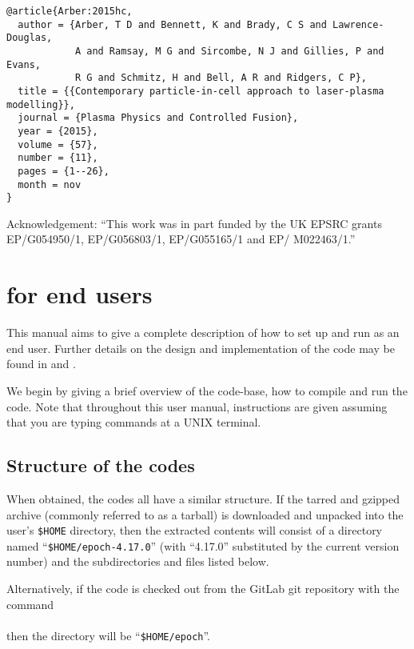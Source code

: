 \begin{verbatim}
@article{Arber:2015hc,
  author = {Arber, T D and Bennett, K and Brady, C S and Lawrence-Douglas,
            A and Ramsay, M G and Sircombe, N J and Gillies, P and Evans,
            R G and Schmitz, H and Bell, A R and Ridgers, C P},
  title = {{Contemporary particle-in-cell approach to laser-plasma modelling}},
  journal = {Plasma Physics and Controlled Fusion},
  year = {2015},
  volume = {57},
  number = {11},
  pages = {1--26},
  month = nov
}
\end{verbatim}

Acknowledgement: ``This work was in part funded by the UK EPSRC grants
EP/G054950/1, EP/G056803/1, EP/G055165/1 and EP/ M022463/1.''

\newpage
\section{\texorpdfstring
  {{\EPOCH} for end users}
  {{EPOCH} for end users}}
\label{sec:endusers}
This manual aims to give a complete description of how to set up and run
{\EPOCH} as an end user. Further details on the design and implementation of
the code may be found in \citet{Arber} and \citet{Ridgers}.

We begin by giving a brief overview of the {\EPOCH} code-base, how to
compile and run the code. Note that throughout this user manual, instructions
are given assuming that you are typing commands at a UNIX terminal.

\subsection{\texorpdfstring
  {Structure of the {\EPOCH} codes}
  {Structure of the {EPOCH} codes}}
\label{sec:directory_structure}
When obtained, the {\EPOCH} codes all have a similar structure. If the tarred
and gzipped archive (commonly referred to as a tarball) is downloaded and
unpacked into the user's \verb|$HOME| directory, then the extracted contents
will consist of a directory named ``\verb|$HOME/epoch-4.17.0|''
(with ``4.17.0'' substituted by the current version number) and the
subdirectories and files listed below.

Alternatively, if the code is checked out from the GitLab git
repository with the command\\
\indent{}\\
\noindent%
then the directory will be ``\verb|$HOME/epoch|''.


